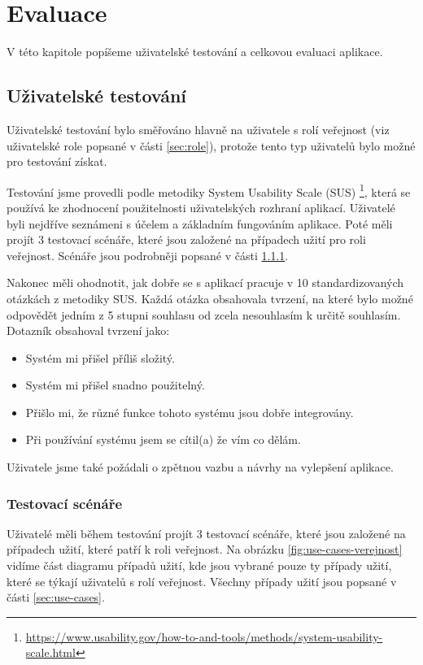 

\chapter{Evaluace}\label{kap:evaluace}

V této kapitole popíšeme uživatelské testování a celkovou evaluaci aplikace.

\section{Uživatelské testování}

Uživatelské testování bylo směřováno hlavně na uživatele s rolí veřejnost (viz uživatelské role popsané v části \ref{sec:role}), protože tento typ uživatelů bylo možné pro testování získat.

Testování jsme provedli podle metodiky System Usability Scale (SUS) \footnote{\url{https://www.usability.gov/how-to-and-tools/methods/system-usability-scale.html}}, která se používá ke zhodnocení použitelnosti uživatelských rozhraní aplikací. Uživatelé byli nejdříve seznámeni s účelem a základním fungováním aplikace. Poté měli projít 3 testovací scénáře, které jsou založené na případech užití pro roli veřejnost. Scénáře jsou podrobněji popsané v části \ref{sub:test-cases}. 

Nakonec měli ohodnotit, jak dobře se s aplikací pracuje v 10 standardizovaných otázkách z metodiky SUS. Každá otázka obsahovala tvrzení, na které bylo možné odpovědět jedním z 5 stupni souhlasu od zcela nesouhlasím k určitě souhlasím. Dotazník obsahoval tvrzení jako:
\begin{itemize}
    \item Systém mi přišel příliš složitý.
    \item Systém mi přišel snadno použitelný.
    \item Přišlo mi, že různé funkce tohoto systému jsou dobře integrovány.
    \item Při používání systému jsem se cítil(a) že vím co dělám.
\end{itemize}
Uživatele jsme také požádali o zpětnou vazbu a návrhy na vylepšení aplikace.

\subsection{Testovací scénáře}\label{sub:test-cases}

Uživatelé měli během testování projít 3 testovací scénáře, které jsou založené na případech užití, které patří k roli veřejnost. Na obrázku \ref{fig:use-cases-verejnost} vidíme část diagramu případů užití, kde jsou vybrané pouze ty případy užití, které se týkají uživatelů s rolí veřejnost. Všechny případy užití jsou popsané v části \ref{sec:use-cases}.

